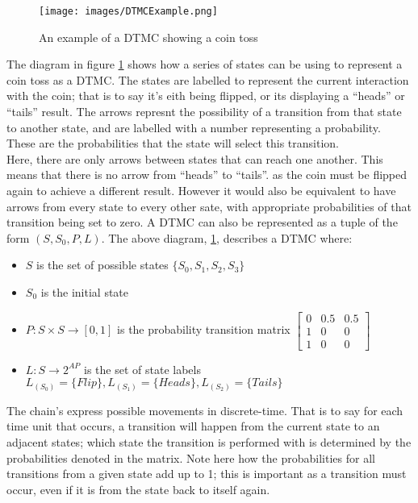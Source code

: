 \documentclass{l4proj}
\begin{document}
\begin{figure}[ht!]
\centering
\texttt{[image: images/DTMCExample.png]}
\caption{An example of a DTMC showing a coin toss}
\label{dtmc}
\end{figure}

The diagram in figure \ref{dtmc} shows how a series of states can be using to represent a coin toss as a DTMC. The states are labelled to represent the current interaction with the coin; that is to say it's eith being flipped, or its displaying a ``heads'' or ``tails'' result. The arrows represnt the possibility of a transition from that state to another state, and are labelled with a number representing a probability. These are the probabilities that the state will select this transition.\\
Here, there are only arrows between states that can reach one another. This means that there is no arrow from ``heads'' to ``tails''. as the coin must be flipped again to achieve a different result. However it would also be equivalent to have arrows from every state to every other sate, with appropriate probabilities of that transition being set to zero.
A DTMC can also be represented as a tuple of the form $(S, S{_0}, P, L)$. The above diagram, \ref{dtmc}, describes a DTMC where:
\begin{itemize}
\item{$S$ is the set of possible states $\lbrace S_0, S_1, S_2, S_3 \rbrace $}
\item{$S{_0}$ is the initial state}
\item{$P : S \times S \rightarrow [0,1]$ is the probability transition matrix $\begin{bmatrix}
0 & 0.5 & 0.5\\ 
1 & 0 & 0\\ 
1 & 0 & 0
\end{bmatrix}$}
\item{$L : S \rightarrow 2^{AP}$ is the set of state labels $L_{(S_0)}=\lbrace Flip \rbrace , L_{(S_1)}=\lbrace Heads \rbrace , L_{(S_2)}=\lbrace Tails \rbrace$}
\end{itemize}

The chain's express possible movements in discrete-time. That is to say for each time unit that occurs, a transition will happen from the current state to an adjacent states; which state the transition is performed with is determined by the probabilities denoted in the matrix. Note here how the probabilities for all transitions from a given state add up to 1; this is important as a transition must occur, even if it is from the state back to itself again. 
\end{document}
